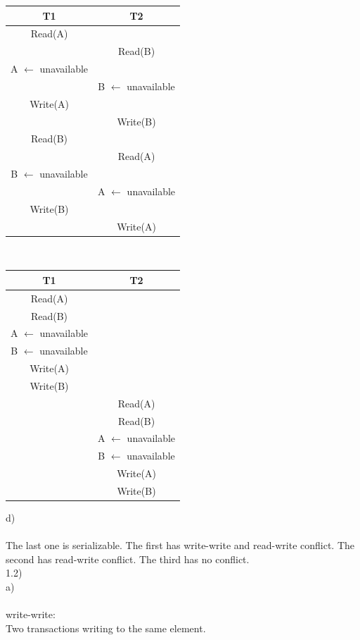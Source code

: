 \documentclass[12pt, letterpaper, twoside]{article}
\begin{document}
\begin{tabular}{ |c|c| }
 \hline
 T1 & T2\\ [0.5ex]
 \hline
 Read(A)&\\
 &Read(B)\\
 A $\leftarrow$ unavailable&\\
 &B $\leftarrow$ unavailable\\
 Write(A)&\\
 &Write(B)\\ 

 Read(B)&\\
 &Read(A)\\
 B $\leftarrow$ unavailable&\\
 &A $\leftarrow$ unavailable\\
 Write(B)&\\ 
 &Write(A)\\
 \hline
\end{tabular}\\
\begin{center}
\begin{tabular}{ |c|c| }
 \hline
 T1 & T2\\ [0.5ex]
 \hline
 Read(A)&\\
 Read(B)&\\
 A $\leftarrow$ unavailable&\\
 B $\leftarrow$ unavailable&\\
 Write(A)&\\
 Write(B)&\\ 
 
 &Read(A)\\
 &Read(B)\\
 &A $\leftarrow$ unavailable\\
 &B $\leftarrow$ unavailable\\
 &Write(A)\\
 &Write(B)\\
 \hline
\end{tabular}
\end{center}
d)\\
\ \\
The last one is serializable. The first has write-write and read-write conflict. The second has read-write conflict. The third has no conflict.
\newpage
\ \\
1.2)\\
a)\\
\ \\
write-write:\\
Two transactions writing to the same element.\\
\end{document}
